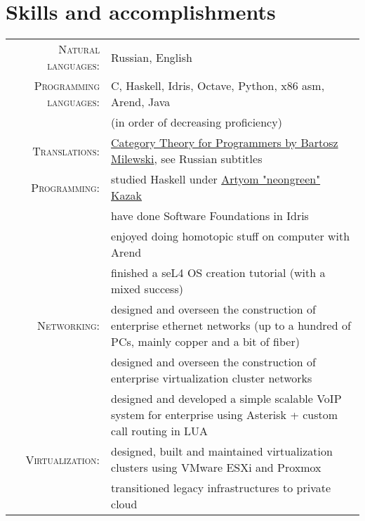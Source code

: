 \documentclass[a4paper,11pt]{article}
\begin{document}
  \section{Skills and accomplishments}
    \begin{longtable}{rp{}}
      \textsc{Natural languages:} & Russian, English \\

      \textsc{Programming languages:} & C, Haskell, Idris, Octave, Python, x86 asm, Arend, Java \\
                                      & (in order of decreasing proficiency)                    \\

      \textsc{Translations:} & \href{https://www.youtube.com/playlist?list=PLbgaMIhjbmEnaH\_LTkxLI7FMa2HsnawM\_}
                               {Category Theory for Programmers by Bartosz Milewski}, see Russian subtitles      \\

      \textsc{Programming:} & studied Haskell under \href{https://artyom.me}{Artyom "neongreen" Kazak}   \\
                            & have done Software Foundations in Idris                                    \\
                            & enjoyed doing homotopic stuff on computer with Arend                       \\
                            & finished a seL4 OS creation tutorial (with a mixed success)                \\

      \textsc{Networking:} & designed and overseen the construction of enterprise ethernet
                             networks (up to a hundred of PCs, mainly copper and a bit of fiber) \\
                           & designed and overseen the construction of enterprise virtualization
                             cluster networks                                                    \\
                           & designed and developed a simple scalable VoIP system for enterprise
                             using Asterisk + custom call routing in LUA                         \\

      \textsc{Virtualization:} & designed, built and maintained virtualization clusters using VMware ESXi and Proxmox \\
                               & transitioned legacy infrastructures to private cloud                                 \\


\end{longtable}
\end{document}
